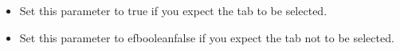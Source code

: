 
\begin{itemize}
\item Set this parameter to true if you expect the tab to be selected.
\item Set this parameter to \app{}efbooleanfalse if you expect the tab not to be selected.
\end{itemize}
